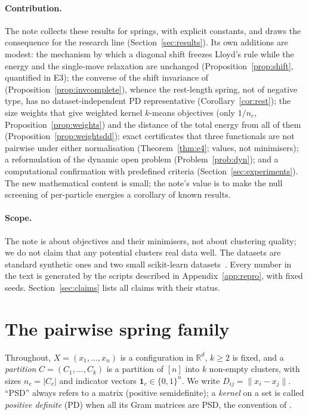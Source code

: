 \documentclass[11pt,a4paper]{article}
\theoremstyle{plain}
\theoremstyle{definition}
\theoremstyle{remark}
\newcommand{\R}{\mathbb{R}}
\newcommand{\one}{\mathbf 1}
\begin{document}
\paragraph{Contribution.} The note collects these results for springs, with explicit constants, and draws the consequence for the research line (Section~\ref{sec:results}). Its own additions are modest: the mechanism by which a diagonal shift freezes Lloyd's rule while the energy and the single-move relaxation are unchanged (Proposition~\ref{prop:shift}, quantified in E3); the converse of the shift invariance of \citet{roth2003} (Proposition~\ref{prop:invcomplete}), whence the rest-length spring, not of negative type, has no dataset-independent PD representative (Corollary~\ref{cor:rest}); the size weights that give weighted kernel $k$-means objectives (only $1/n_c$, Proposition~\ref{prop:weights}) and the distance of the total energy from all of them (Proposition~\ref{prop:weightsdd}); exact certificates that three functionals are not pairwise under either normalisation (Theorem~\ref{thm:e4}; values, not minimisers); a reformulation of the dynamic open problem (Problem~\ref{prob:dyn}); and a computational confirmation with predefined criteria (Section~\ref{sec:experiments}). The new mathematical content is small; the note's value is to make the null screening of per-particle energies a corollary of known results.

\paragraph{Scope.} The note is about objectives and their minimisers, not about clustering quality; we do not claim that any potential clusters real data well. The datasets are standard synthetic ones and two small scikit-learn datasets~\citep{pedregosa2011}. Every number in the text is generated by the scripts described in Appendix~\ref{app:repro}, with fixed seeds. Section~\ref{sec:claims} lists all claims with their status.

\section{The pairwise spring family}\label{sec:family}

Throughout, $X=(x_1,\dots,x_n)$ is a configuration in $\R^d$, $k\ge2$ is fixed, and a \emph{partition} $C=(C_1,\dots,C_k)$ is a partition of $[n]$ into $k$ non-empty clusters, with sizes $n_c=|C_c|$ and indicator vectors $\one_c\in\{0,1\}^n$. We write $D_{ij}=\lVert x_i-x_j\rVert$. ``PSD'' always refers to a matrix (positive semidefinite); a \emph{kernel} on a set is called \emph{positive definite} (PD) when all its Gram matrices are PSD, the convention of \citet{bcr1984}.
\end{document}
